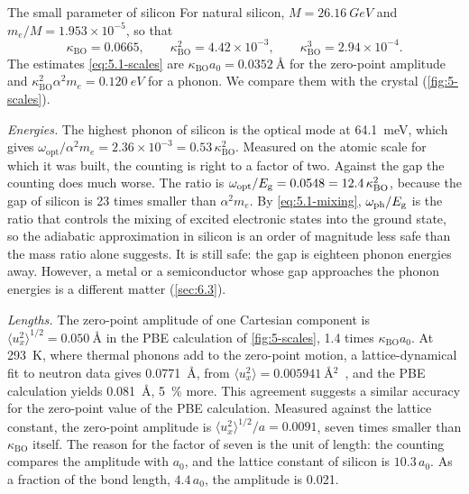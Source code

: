 \begin{workedexample}{The small parameter of silicon}\label{we:5-kappa}
For natural silicon, $M = \SI{26.16}{GeV}$ and $m_e/M = 1.953\times10^{-5}$, so that
\begin{equation*}
  \kappa_{\mathrm{BO}} = 0.0665 , \qquad \kappa_{\mathrm{BO}}^2 = 4.42\times10^{-3} , \qquad \kappa_{\mathrm{BO}}^3 = 2.94\times10^{-4} .
\end{equation*}
The estimates \cref{eq:5.1-scales} are $\kappa_{\mathrm{BO}}a_0 = \SI{0.0352}{\angstrom}$ for the zero-point amplitude and $\kappa_{\mathrm{BO}}^2\alpha^2m_e = \SI{0.120}{eV}$ for a phonon. We compare them with the crystal (\cref{fig:5-scales}).

\emph{Energies.} The highest phonon of silicon is the optical mode at \SI{64.1}{meV}, which gives $\omega_{\mathrm{opt}}/\alpha^2m_e = 2.36\times10^{-3} = 0.53\,\kappa_{\mathrm{BO}}^2$. Measured on the atomic scale for which it was built, the counting is right to a factor of two. Against the gap the counting does much worse. The ratio is $\omega_{\mathrm{opt}}/E_{\mathrm{g}} = 0.0548 = 12.4\,\kappa_{\mathrm{BO}}^2$, because the gap of silicon is 23 times smaller than $\alpha^2m_e$. By \cref{eq:5.1-mixing}, $\omega_{\mathrm{ph}}/E_{\mathrm{g}}$ is the ratio that controls the mixing of excited electronic states into the ground state, so the adiabatic approximation in silicon is an order of magnitude less safe than the mass ratio alone suggests. It is still safe: the gap is eighteen phonon energies away. However, a metal or a semiconductor whose gap approaches the phonon energies is a different matter (\cref{sec:6.3}).

\emph{Lengths.} The zero-point amplitude of one Cartesian component is $\langle u_x^2\rangle^{1/2} = \SI{0.050}{\angstrom}$ in the PBE calculation of \cref{fig:5-scales}, 1.4 times $\kappa_{\mathrm{BO}}a_0$. At \SI{293}{K}, where thermal phonons add to the zero-point motion, a lattice-dynamical fit to neutron data gives \SI{0.0771}{\angstrom}, from $\langle u_x^2\rangle = \SI{0.005941}{\angstrom^2}$~\cite{flensburg1999lattice}, and the PBE calculation yields \SI{0.081}{\angstrom}, \SI{5}{\percent} more. This agreement suggests a similar accuracy for the zero-point value of the PBE calculation. Measured against the lattice constant, the zero-point amplitude is $\langle u_x^2\rangle^{1/2}/a = 0.0091$, seven times smaller than $\kappa_{\mathrm{BO}}$ itself. The reason for the factor of seven is the unit of length: the counting compares the amplitude with $a_0$, and the lattice constant of silicon is $10.3\,a_0$. As a fraction of the bond length, $4.4\,a_0$, the amplitude is 0.021.


\end{workedexample}
